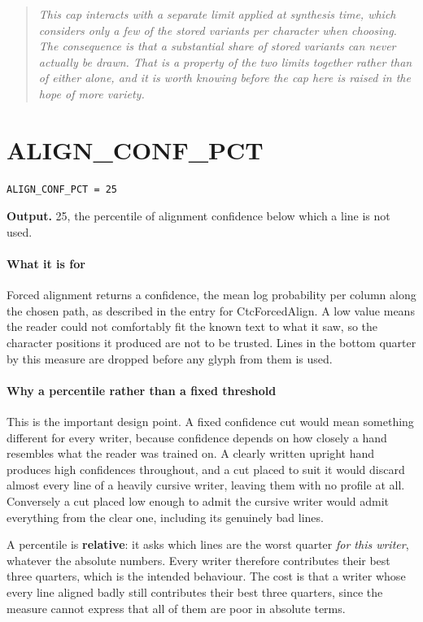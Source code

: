 \begin{quote}\small\itshape This cap interacts with a separate limit applied at synthesis time, which considers only a few of the stored variants per character when choosing. The consequence is that a substantial share of stored variants can never actually be drawn. That is a property of the two limits together rather than of either alone, and it is worth knowing before the cap here is raised in the hope of more variety.\end{quote}

\section{ALIGN\_CONF\_PCT}
\begin{lstlisting}[style=sig]
ALIGN_CONF_PCT = 25
\end{lstlisting}

\noindent\textbf{Output.} 25, the percentile of alignment confidence below which a line is not used.


\paragraph{What it is for}
Forced alignment returns a confidence, the mean log probability per column along the chosen path, as described in the entry for CtcForcedAlign. A low value means the reader could not comfortably fit the known text to what it saw, so the character positions it produced are not to be trusted. Lines in the bottom quarter by this measure are dropped before any glyph from them is used.


\paragraph{Why a percentile rather than a fixed threshold}
This is the important design point. A fixed confidence cut would mean something different for every writer, because confidence depends on how closely a hand resembles what the reader was trained on. A clearly written upright hand produces high confidences throughout, and a cut placed to suit it would discard almost every line of a heavily cursive writer, leaving them with no profile at all. Conversely a cut placed low enough to admit the cursive writer would admit everything from the clear one, including its genuinely bad lines.

A percentile is \textbf{relative}: it asks which lines are the worst quarter \emph{for this writer}, whatever the absolute numbers. Every writer therefore contributes their best three quarters, which is the intended behaviour. The cost is that a writer whose every line aligned badly still contributes their best three quarters, since the measure cannot express that all of them are poor in absolute terms.


